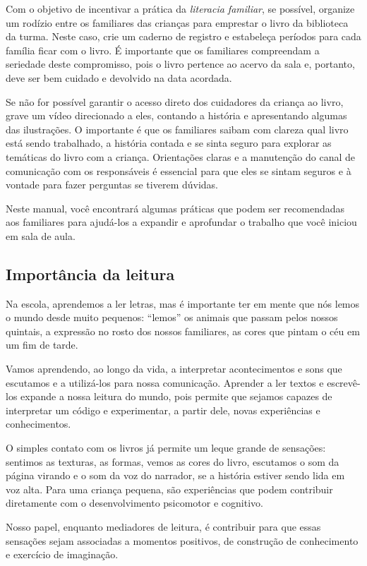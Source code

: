 \documentclass[11pt]{extarticle}
\begin{document}
Com o objetivo de incentivar 
a prática da \textit{literacia familiar}, se possível, organize um rodízio entre os familiares 
das crianças para emprestar o livro da biblioteca da turma. Neste caso, crie um caderno 
de registro e estabeleça períodos para cada família ficar com o livro. É importante 
que os familiares compreendam a seriedade deste compromisso, pois o livro pertence 
ao acervo da sala e, portanto, deve ser bem cuidado e devolvido na data acordada. 

Se não for possível garantir o acesso direto dos cuidadores da criança ao livro, 
grave um vídeo direcionado a eles, contando a história e apresentando algumas 
das ilustrações. O importante é que os familiares saibam com clareza qual livro 
está sendo trabalhado, a história contada e se sinta seguro para explorar as temáticas 
do livro com a criança. Orientações claras e a manutenção do canal de comunicação com 
os responsáveis é essencial para que eles se sintam seguros e à vontade para fazer perguntas 
se tiverem dúvidas. 

Neste manual, você encontrará algumas práticas que podem ser 
recomendadas aos familiares para ajudá-los a expandir e aprofundar o trabalho 
que você iniciou em sala de aula.


\subsection{Importância da leitura}
Na escola, aprendemos a ler letras, mas é importante ter em mente que nós 
lemos o mundo desde muito pequenos: “lemos” os animais que passam pelos nossos 
quintais, a expressão no rosto dos nossos familiares, as cores que pintam o céu 
em um fim de tarde. 

Vamos aprendendo, ao longo da vida, a interpretar acontecimentos 
e sons que escutamos e a utilizá-los para nossa comunicação. Aprender a ler textos e 
escrevê-los expande a nossa leitura do mundo, pois permite que sejamos capazes de 
interpretar um código e experimentar, a partir dele, novas experiências e conhecimentos. 

O simples contato com os livros já permite um leque grande de sensações: 
sentimos as texturas, as formas, vemos as cores do livro, escutamos o som da página 
virando e o som da voz do narrador, se a história estiver sendo lida em voz alta. Para uma 
criança pequena, são experiências que podem contribuir diretamente com o desenvolvimento psicomotor 
e cognitivo. 

Nosso papel, enquanto mediadores de leitura, é contribuir para que essas 
sensações sejam associadas a momentos positivos, de construção de 
conhecimento e exercício de imaginação. 
\end{document}
